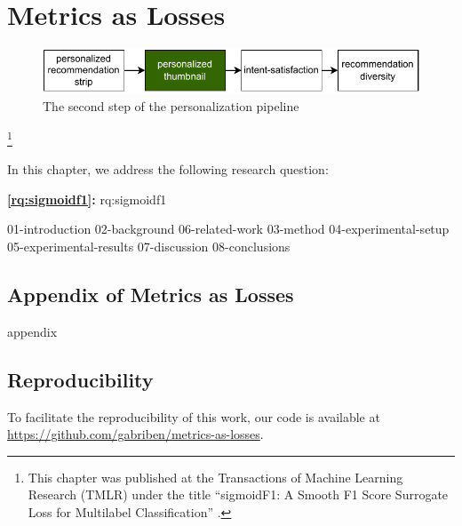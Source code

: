
\chapter{Metrics as Losses}
\label{chapter:research-sigmoidf1}

\begin{figure}[ht]
  \centering
  \includegraphics{images/pipeline_step2.pdf}
  \caption{The second step of the personalization pipeline}
  \label{fig:pip2}
\end{figure}

\footnote[]{This chapter was published at the Transactions of Machine Learning Research (TMLR) under the title ``sigmoidF1: A Smooth F1 Score Surrogate Loss for Multilabel Classification'' \citep{sigmoidf1}.}
\acresetall

In this chapter, we address the following research question:

\medskip
\noindent
\textbf{\ref{rq:sigmoidf1}:} \acl{rq:sigmoidf1}
\medskip

\noindent

{01-introduction}
{02-background}
{06-related-work}
{03-method}
{04-experimental-setup}
{05-experimental-results}
{07-discussion}
{08-conclusions}

\begin{appendices}
\chapter{Appendix of Metrics as Losses}
{appendix}
\end{appendices}

\section*{Reproducibility}
To facilitate the reproducibility of this work, our code is available at \url{https://github.com/gabriben/metrics-as-losses}.






